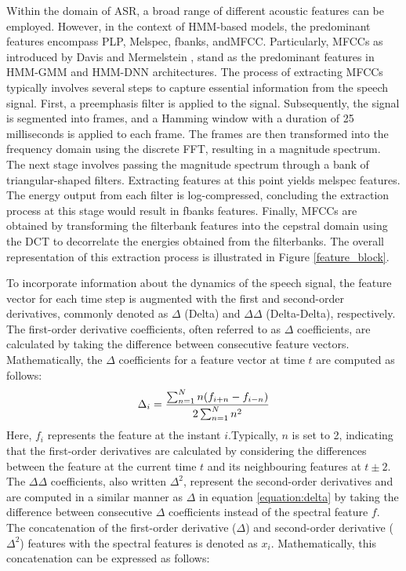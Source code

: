 Within the domain of \ac{ASR}, a broad range of different acoustic features can be employed. However, in the context of \ac{HMM}-based models, the predominant features encompass  \ac{PLP}, Melspec, \ac{fbanks}, and\ac{MFCC}. Particularly, \acp{MFCC} as introduced by Davis and Mermelstein \cite{mfcc}, stand as the predominant features in \ac{HMM-GMM} and \ac{HMM-DNN} architectures.
The process of extracting \acp{MFCC} typically involves several steps to capture essential information from the speech signal. First, a preemphasis filter is applied to the signal. Subsequently, the signal is segmented into frames, and a Hamming window with a duration of 25 milliseconds is applied to each frame. The frames are then transformed into the frequency domain using the discrete \ac{FFT}, resulting in a magnitude spectrum.
The next stage involves passing the magnitude spectrum through a bank of triangular-shaped filters. Extracting features at this point yields melspec features. The energy output from each filter is log-compressed, concluding the extraction process at this stage would result in \ac{fbanks} features. Finally, \acp{MFCC} are obtained by transforming the filterbank features into the cepstral domain using the \ac{DCT} to decorrelate the energies obtained from the filterbanks. The overall representation of this extraction process is illustrated in Figure \ref{feature_block}.


To incorporate information about the dynamics of the speech signal, the feature vector for each time step is augmented with the first and second-order derivatives, commonly denoted as $\Delta$ (Delta) and $\Delta\Delta$ (Delta-Delta), respectively. The first-order derivative coefficients, often referred to as $\Delta$ coefficients, are calculated by taking the difference between consecutive feature vectors. Mathematically, the $\Delta$ coefficients for a feature vector at time $t$ are computed as follows:
\begin{equation}
 \label{equation:delta}
    \Delta_i = \frac{\sum^{N}_{n=1}n(f_{i+n} - f_{i-n})}{2 \sum^N_{n=1}n^2} \\
\end{equation}
Here, $f_i$ represents the feature at the instant $i$.Typically, $n$ is set to 2, indicating that the first-order derivatives are calculated by considering the differences between the feature at the current time $t$ and its neighbouring features at $t \pm 2$. The $\Delta\Delta$ coefficients, also written $\Delta^2$, represent the second-order derivatives and are computed in a similar manner as $\Delta$ in equation \ref{equation:delta} by taking the difference between consecutive $\Delta$ coefficients instead of the spectral feature $f$. The concatenation of the first-order derivative ($\Delta$) and second-order derivative ($\Delta^2$) features with the spectral features is denoted as $x_i$. Mathematically, this concatenation can be expressed as follows:

